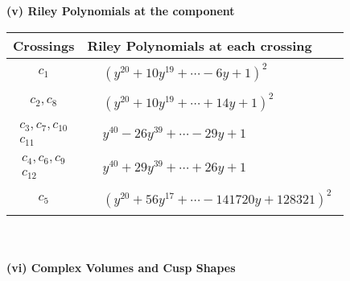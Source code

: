 \documentclass[1p]{elsarticle_modified}
\theoremstyle{definition}
\begin{document}
\newpage\renewcommand{\arraystretch}{1}
\flushleft \textbf{(v) Riley Polynomials at the component}\newline \\
\begin{tabular}{m{50pt}|m{274pt}}
Crossings & \hspace{64pt}Riley Polynomials at each crossing \\
\hline $$\begin{aligned}c_{1}\end{aligned}$$&$\begin{aligned}
&(y^{20}+10 y^{19}+\cdots-6 y+1)^{2}
\end{aligned}$\\
\hline $$\begin{aligned}c_{2},c_{8}\end{aligned}$$&$\begin{aligned}
&(y^{20}+10 y^{19}+\cdots+14 y+1)^{2}
\end{aligned}$\\
\hline $$\begin{aligned}c_{3},c_{7},c_{10}\\c_{11}\end{aligned}$$&$\begin{aligned}
&y^{40}-26 y^{39}+\cdots-29 y+1
\end{aligned}$\\
\hline $$\begin{aligned}c_{4},c_{6},c_{9}\\c_{12}\end{aligned}$$&$\begin{aligned}
&y^{40}+29 y^{39}+\cdots+26 y+1
\end{aligned}$\\
\hline $$\begin{aligned}c_{5}\end{aligned}$$&$\begin{aligned}
&(y^{20}+56 y^{17}+\cdots-141720 y+128321)^{2}
\end{aligned}$\\
\hline
\end{tabular}\\~\\
\newpage\flushleft \textbf{(vi) Complex Volumes and Cusp Shapes}
\end{document}
